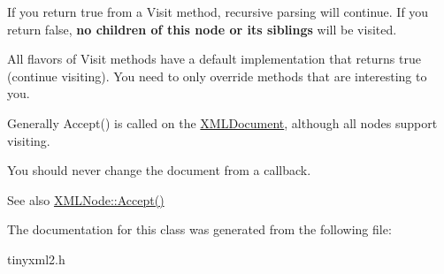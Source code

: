 If you return \textquotesingle{}true\textquotesingle{} from a Visit method, recursive parsing will continue. If you return false, {\bfseries{no children of this node or its siblings}} will be visited.

All flavors of Visit methods have a default implementation that returns \textquotesingle{}true\textquotesingle{} (continue visiting). You need to only override methods that are interesting to you.

Generally Accept() is called on the \mbox{\hyperlink{classtinyxml2_1_1_x_m_l_document}{X\+M\+L\+Document}}, although all nodes support visiting.

You should never change the document from a callback.

\begin{DoxySeeAlso}{See also}
\mbox{\hyperlink{classtinyxml2_1_1_x_m_l_node_a81e66df0a44c67a7af17f3b77a152785}{X\+M\+L\+Node\+::\+Accept()}} 
\end{DoxySeeAlso}


The documentation for this class was generated from the following file\+:\begin{DoxyCompactItemize}
\item 
tinyxml2.\+h\end{DoxyCompactItemize}
